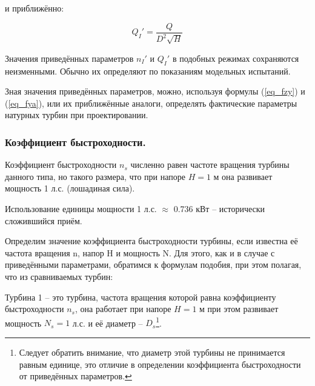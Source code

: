 и приближённо:

\begin{equation}
\label{eq_fyb}
   Q_I' = \frac{Q}{D^2 \sqrt{H}}
\end{equation}


\vspace{0.5cm}

Значения приведённых параметров $n_I'$ и $Q_I'$ в подобных режимах сохраняются неизменными. Обычно их определяют по показаниям модельных испытаний.

Зная значения приведённых параметров, можно, используя формулы (\ref{eq_fzy}) и (\ref{eq_fya}), или их приближённые аналоги, определять фактические параметры натурных турбин при проектировании.




\subsubsection{Коэффициент быстроходности.}

 \begin{opred}
    Коэффициент быстроходности $n_s$ численно равен частоте вращения турбины данного типа, но такого размера, что при напоре $H = 1$ м она развивает мощность 1 л.с. (лошадиная сила).
\end{opred}

Использование единицы мощности 1 л.с. $\approx$ 0.736 кВт -- исторически сложившийся приём.



Определим значение коэффициента быстроходности турбины, если известна её частота вращения n, напор H и мощность N. Для этого, как и в случае с приведёнными параметрами,  обратимся к формулам подобия, при этом полагая, что из сравниваемых турбин:


\vspace{0.5cm}

Турбина 1 -- это турбина, частота вращения которой равна коэффициенту быстроходности $n_s$, она работает при напоре $H=1$ м при этом развивает мощность $N_s = 1$ л.с. и её диаметр -- $D_s$\footnote{Следует обратить внимание, что диаметр этой турбины не принимается равным единице, это отличие в определении коэффициента быстроходности от приведённых параметров.}. 

